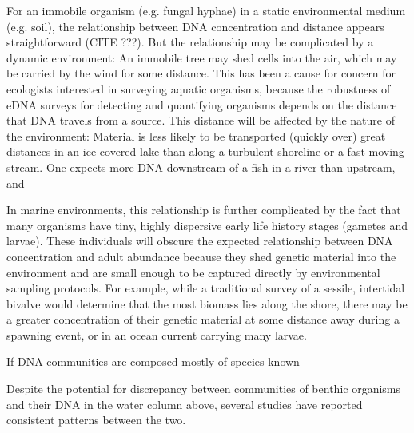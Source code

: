 \documentclass[11pt,letterpaper]{article} %
\begin{document}
For an immobile organism (e.g. fungal hyphae) %
in a static environmental medium (e.g. soil), %
the relationship between DNA concentration and distance appears straightforward (CITE ???).
But the relationship may be complicated by a dynamic environment: %
An immobile tree may shed cells into the air, which may be carried by the wind for some distance.
This has been a cause for concern for ecologists interested in surveying aquatic organisms,
because the robustness of eDNA surveys for detecting and quantifying organisms depends on the distance that DNA travels from a source. %
This distance will be affected by the nature of the environment:
Material is less likely to be transported (quickly over) great distances in an ice-covered lake
than along a turbulent shoreline or a fast-moving stream.
One expects more DNA downstream of a fish in a river than upstream, and


In marine environments, this relationship is further complicated by the fact
that many organisms have tiny, highly dispersive early life history stages (gametes and larvae).
These individuals will obscure the expected relationship between DNA concentration and adult abundance because they
shed genetic material into the environment and
are small enough to be captured directly by environmental sampling protocols.
For example, while a traditional survey of a sessile, intertidal bivalve would
determine that the most biomass lies along the shore, there may be a greater concentration
of their genetic material at some distance away during a spawning event, or in
an ocean current carrying many larvae.


If DNA communities are composed mostly of species known

Despite the potential for discrepancy between communities of benthic organisms and their DNA in the water column above, several studies have reported consistent patterns between the two.
\end{document}
